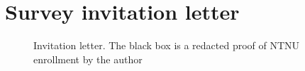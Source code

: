 \chapter{Survey invitation letter}

\begin{figure}[H]
    \centering
    \caption{Invitation letter. The black box is a redacted proof of NTNU enrollment by the author}
    \label{fig:letter}
\end{figure}